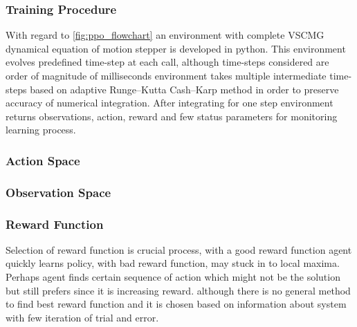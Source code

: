 \subsubsection{Training Procedure}
With regard to \autoref{fig:ppo_flowchart} an environment with complete VSCMG dynamical equation of motion stepper is developed in python. This environment evolves predefined time-step at each call, although time-steps considered are order of magnitude of milliseconds environment takes multiple intermediate time-steps based on adaptive  Runge–Kutta Cash–Karp method in order to preserve accuracy of numerical integration. After integrating for one step environment returns observations, action, reward and few status parameters for monitoring learning process. 


\subsubsection{Action Space}

\subsubsection{Observation Space}

\subsubsection{Reward Function}
Selection of reward function is crucial process, with a good reward function agent quickly learns policy, with bad reward function, may stuck in to local maxima. Perhaps agent finds certain sequence of action which might not be the solution but still prefers since it is increasing reward.
although there is no general method to find best reward function and it is chosen based on information about system with few iteration of trial and error.

